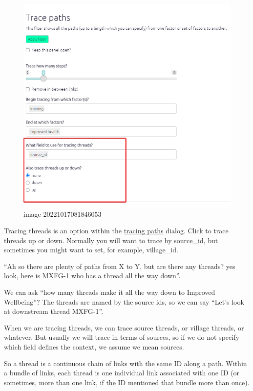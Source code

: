 \documentclass[
]{book}
\begin{document}
\begin{figure}
\centering
\includegraphics{_assets/image-20221017081846053.png}
\caption{image-20221017081846053}
\end{figure}

Tracing threads is an option within the \protect\hyperlink{xtracing-paths}{tracing paths} dialog. Click to trace threads up or down. Normally you will want to trace by source\_id, but sometimes you might want to set, for example, village\_id.

``Ah so there are plenty of paths from X to Y, but are there any threads? yes look, here is MXFG-1 who has a thread all the way down''.

We can ask ``how many threads make it all the way down to Improved Wellbeing''? The threads are named by the source ids, so we can say ``Let's look at downstream thread MXFG-1''.

When we are tracing threads, we can trace source threads, or village threads, or whatever. But usually we will trace in terms of sources, so if we do not specify which field defines the context, we assume we mean sources.

So a thread is a continuous chain of links with the same ID along a path. Within a bundle of links, each thread is one individual link associated with one ID (or sometimes, more than one link, if the ID mentioned that bundle more than once).
\end{document}
